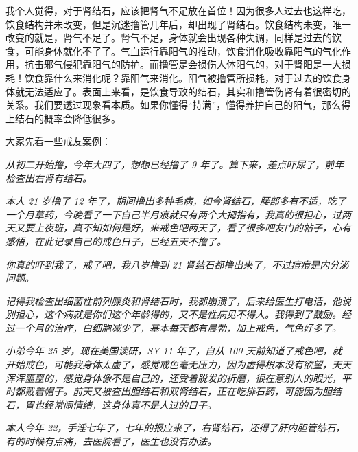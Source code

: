我个人觉得，对于肾结石，应该把肾气不足放在首位！因为很多人过去也这样吃，饮食结构并未改变，但是沉迷撸管几年后，却出现了肾结石。饮食结构未变，唯一改变的就是，肾气不足了。肾气不足，身体就会出现各种失调，同样是过去的饮食，可能身体就化不了了。气血运行靠阳气的推动，饮食消化吸收靠阳气的气化作用，抗击邪气侵犯靠阳气的防护。而撸管是会损伤人体阳气的，对于肾阳是一大损耗！饮食靠什么来消化呢？靠阳气来消化。阳气被撸管所损耗，对于过去的饮食身体就无法适应了。表面上来看，是饮食导致的结石，其实和撸管伤肾有着很密切的关系。我们要透过现象看本质。如果你懂得“持满”，懂得养护自己的阳气，那么得上结石的概率会降低很多。

大家先看一些戒友案例：

\begin{case}[结石]\it
    从初二开始撸，今年大四了，想想已经撸了 9 年了。算下来，差点吓尿了，前年检查出右肾有结石。
\end{case}

\begin{case}[结石]\it
    本人 21 岁撸了 12 年了，期间撸出多种毛病，如今肾结石，腰部多有不适，吃了一个月草药，今晚看了一下自己半月痕就只有两个大拇指有，我真的很担心，过两天又要上夜班，真不知如何是好，来戒色吧两天了，看了很多吧友门的帖子，心有感悟，在此记录自己的戒色日子，已经五天不撸了。
\end{case}

\begin{case}[结石]\it
    你真的吓到我了，戒了吧，我八岁撸到 21 肾结石都撸出来了，不过痘痘是内分泌问题。
\end{case}

\begin{case}[结石]\it
    记得我检查出细菌性前列腺炎和肾结石时，我都崩溃了，后来给医生打电话，他说别担心，这个病就是你们这个年龄得的，又不是性病见不得人。我得到了鼓励。经过一个月的治疗，白细胞减少了，基本每天都有晨勃，加上戒色，气色好多了。
\end{case}

\begin{case}[结石]\it
    小弟今年 25 岁，现在美国读研，SY 11 年了，自从 100 天前知道了戒色吧，就开始戒色，可能我身体太虚了，感觉戒色毫无压力，因为虚得根本没有欲望，天天浑浑噩噩的，感觉身体像不是自己的，还受着脱发的折磨，很在意别人的眼光，平时都戴着帽子。前天又被查出胆结石和双肾结石，正在吃排石药，可能因为胆结石，胃也经常闹情绪，这身体真不是人过的日子。
\end{case}

\begin{case}[结石]\it
    本人今年 22，手淫七年了，七年的报应来了，右肾结石，还得了肝内胆管结石，有的时候有点痛，去医院看了，医生也没有办法。
\end{case}

